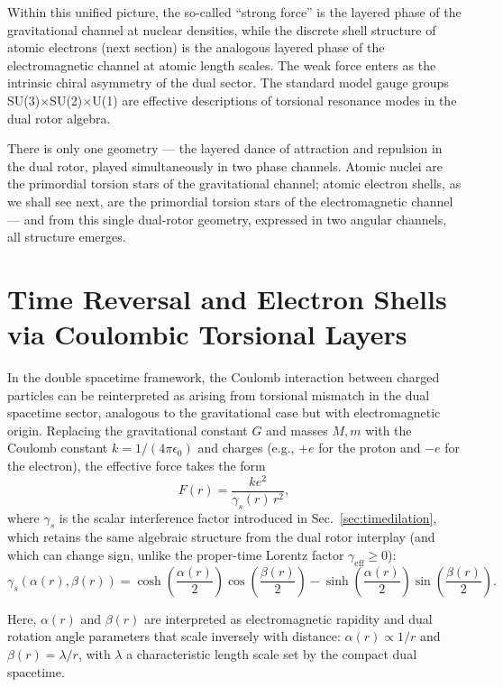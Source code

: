 \documentclass[dvipdfmx,a4paper]{article}
\begin{document}
Within this unified picture, the so-called ``strong force'' is the layered phase of the gravitational channel at nuclear densities, while the discrete shell structure of atomic electrons (next section) is the analogous layered phase of the electromagnetic channel at atomic length scales. The weak force enters as the intrinsic chiral asymmetry of the dual sector. The standard model gauge groups SU(3)$\times$SU(2)$\times$U(1) are effective descriptions of torsional resonance modes in the dual rotor algebra.

There is only one geometry — the layered dance of attraction and repulsion in the dual rotor, played simultaneously in two phase channels. Atomic nuclei are the primordial torsion stars of the gravitational channel; atomic electron shells, as we shall see next, are the primordial torsion stars of the electromagnetic channel — and from this single dual-rotor geometry, expressed in two angular channels, all structure emerges.

\section{Time Reversal and Electron Shells via Coulombic Torsional Layers}
\label{sec:electronshells}

In the double spacetime framework, the Coulomb interaction between charged particles can be reinterpreted as arising from torsional mismatch in the dual spacetime sector, analogous to the gravitational case but with electromagnetic origin. Replacing the gravitational constant \(G\) and masses \(M,m\) with the Coulomb constant \(k = 1/(4\pi\epsilon_0)\) and charges (e.g., \(+e\) for the proton and \(-e\) for the electron), the effective force takes the form
\[
F(r) = \frac{k e^2}{\gamma_s(r)\, r^2},
\]
where \(\gamma_s\) is the scalar interference factor introduced in Sec.~\ref{sec:timedilation}, which retains the same algebraic structure from the dual rotor interplay (and which can change sign, unlike the proper-time Lorentz factor \(\gamma_\text{eff} \geq 0\)):
\[
\gamma_s(\alpha(r),\beta(r)) = \cosh\!\left(\frac{\alpha(r)}{2}\right) \cos\!\left(\frac{\beta(r)}{2}\right) - \sinh\!\left(\frac{\alpha(r)}{2}\right) \sin\!\left(\frac{\beta(r)}{2}\right).
\]

Here, \(\alpha(r)\) and \(\beta(r)\) are interpreted as electromagnetic rapidity and dual rotation angle parameters that scale inversely with distance: \(\alpha(r) \propto 1/r\) and \(\beta(r) = \lambda / r\), with \(\lambda\) a characteristic length scale set by the compact dual spacetime.
\end{document}
